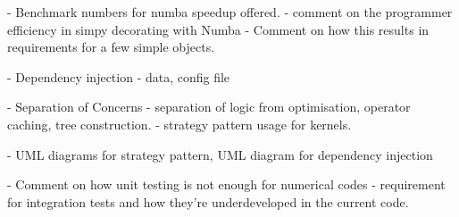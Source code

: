 - Benchmark numbers for numba speedup offered.
- comment on the programmer efficiency in simpy decorating
with Numba
- Comment on how this results in requirements for a few simple objects.

- Dependency injection
    - data, config file

- Separation of Concerns
    - separation of logic from optimisation, operator caching,
    tree construction.
    - strategy pattern usage for kernels.

- UML diagrams for strategy pattern, UML diagram for dependency injection

- Comment on how unit testing is not enough for numerical codes
    - requirement for integration tests and how they're underdeveloped in
    the current code.

